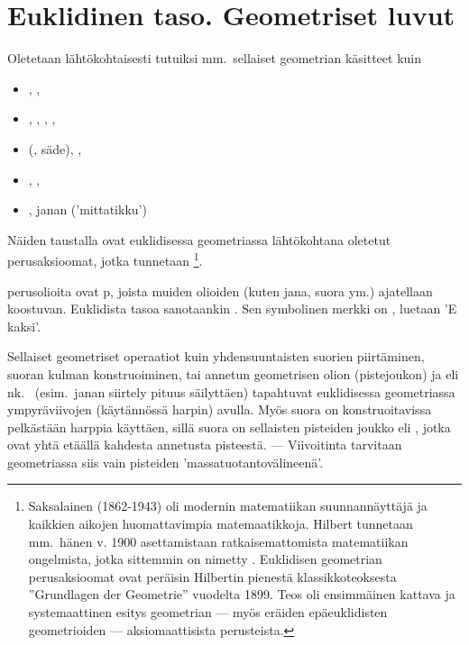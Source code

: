 \section{Euklidinen taso. Geometriset luvut} \label{geomluvut}
\alku
{}

Oletetaan lähtökohtaisesti tutuiksi mm.\ sellaiset geometrian käsitteet kuin
\begin{itemize}
\item  {}, ,  
\item  {}, , , , 
\item  {} (, säde), , 
\item  {}, , 
\item  {}, janan  ('mittatikku')
\end{itemize}
Näiden taustalla ovat euklidisessa geometriassa lähtökohtana oletetut perusaksioomat, jotka 
tunnetaan \footnote[2]{Saksalainen  (1862-1943)
oli modernin matematiikan suunnannäyttäjä ja kaikkien aikojen huomattavimpia matemaatikkoja. 
Hilbert tunnetaan mm.\ hänen v. 1900 asettamistaan ratkaisemattomista matematiikan ongelmista, 
jotka sittemmin on nimetty . Euklidisen geometrian perusaksioomat ovat
peräisin Hilbertin pienestä klassikkoteoksesta ''Grundlagen der Geometrie'' vuodelta 1899. Teos
oli ensimmäinen kattava ja systemaattinen esitys geometrian --- myös eräiden epäeuklidisten 
geometrioiden ---  aksiomaattisista perusteista. }.

 perusolioita ovat p, joista muiden olioiden
(kuten jana, suora ym.) ajatellaan koostuvan. Euklidista tasoa sanotaankin
. Sen symbolinen merkki on \Ekaksi, luetaan 'E kaksi'.
\vspace{5mm}
\begin{figure}[htb]
\begin{center}
\end{center}
\label{fig:oliot}
\end{figure}

Sellaiset geometriset operaatiot kuin yhdensuuntaisten suorien piirtäminen, suoran kulman
konstruoiminen, tai annetun geometrisen olion (pistejoukon)  ja 
%
eli nk.\  (esim.\ janan siirtely pituus säilyttäen) tapahtuvat
euklidisessa geometriassa ympyräviivojen (käytännössä harpin) avulla. Myös suora on 
konstruoitavissa pelkästään harppia käyttäen, sillä suora on sellaisten pisteiden joukko
eli , jotka ovat yhtä etäällä kahdesta annetusta pisteestä. --- Viivoitinta 
tarvitaan geometriassa siis vain pisteiden 'massatuotantovälineenä'. 

